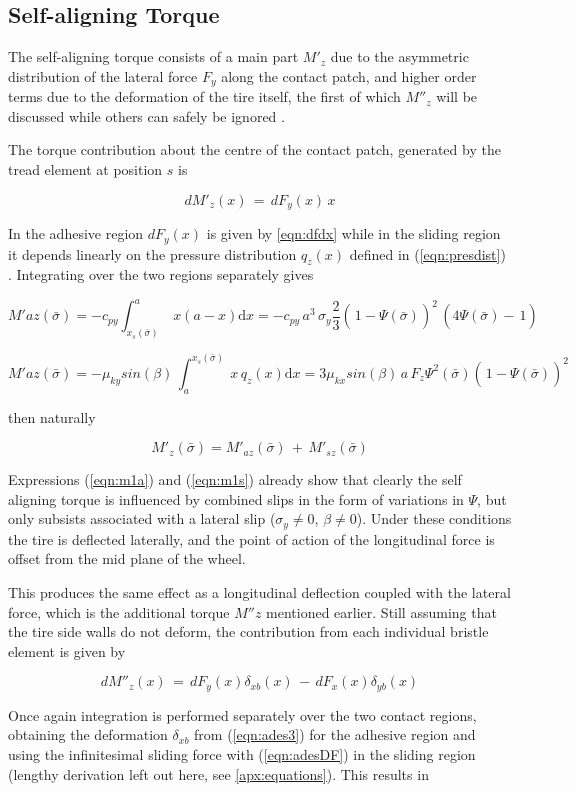 \documentclass[12pt,a4paper]{report}
\newcommand{\eq}[2]{
\begin{equation} \label{#1}
#2
\end{equation}
}
\newcommand{\req}[1]{
(\ref{#1})
}
\newcommand{\de}[1]{
\mathrm{d} #1 
}
\begin{document}
\subsection*{Self-aligning Torque}
The self-aligning torque consists of a main part $M'_z$ due to the asymmetric distribution of the lateral force $F_y$ along the contact patch, and higher order terms due to the deformation of the tire itself, the first of which $M''_z$ will be discussed while others can safely be ignored \citep{wong01}.

The torque contribution about the centre of the contact patch, generated by the tread element at position $s$ is 

\eq{eqn:dtorque}{dM'_z(x) \, = \, dF_y(x) \, x}

In the adhesive region $dF_y(x)$ is given by \ref{eqn:dfdx} while in the sliding region it depends linearly on the pressure distribution $q_z(x)$ defined in \req{eqn:presdist}. Integrating over the two regions separately gives

\eq{eqn:m1a}{M'{az}(\bar{\sigma})=-c_{py} \int_{x_s(\bar{\sigma})}^{a} \: x(a-x) \de{x}=
	-c_{py}\, a^3\, \sigma_y \frac{2}{3}\left(\frac{}{}1-\Psi(\bar{\sigma})\right)^2 \, \left(4\Psi(\bar{\sigma})-\frac{}{}1 \right)}

\eq{eqn:m1s}{M'{az}(\bar{\sigma})=-\mu_{ky} sin(\beta) \,\int_{a}^{x_s(\bar{\sigma})} \: x \,q_z(x) \de{x}=
	3\mu_{kx} sin(\beta)\, a\, F_z \Psi^2(\bar{\sigma})\left(\frac{}{}1-\Psi(\bar{\sigma})\right)^2}
	
then naturally
\eq{eqn:m1}{M'_{z}(\bar{\sigma}) = M'_{az}(\bar{\sigma}) \, + \, M'_{sz}(\bar{\sigma})}

Expressions \req{eqn:m1a} and \req{eqn:m1s} already show that clearly the self aligning torque is influenced by combined slips in the form of variations in $\Psi$, but only subsists associated with a lateral slip ($\sigma_y \neq 0$, $\beta \neq 0$).
Under these conditions the tire is deflected laterally, and the point of action of the longitudinal force is offset from the mid plane of the wheel.

This produces the same effect as a longitudinal deflection coupled with the lateral force, which is the additional torque $M''z$ mentioned earlier.
Still assuming that the tire side walls do not deform, the contribution from each individual bristle element is given by
\eq{eqn:m2z}{dM''_z(x) \,=\, dF_y(x)\delta_{xb}(x) \, - \, dF_x(x)\delta_{yb}(x)}
Once again integration is performed separately over the two contact regions, obtaining the deformation $\delta_{xb}$ from \req{eqn:ades3} for the adhesive region and using the infinitesimal sliding force with \req{eqn:adesDF} in the sliding region (lengthy derivation left out here, see \ref{apx:equations}). This results in
\end{document}
